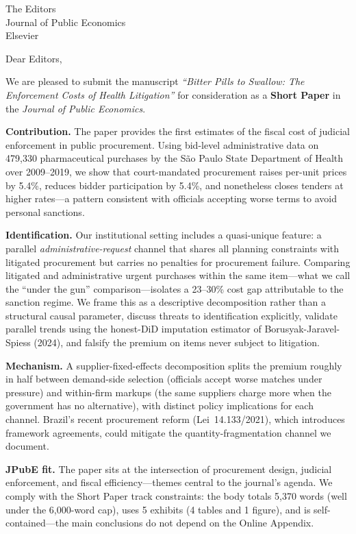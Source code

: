 \documentclass[11pt,a4paper]{letter}
\date{April 17, 2026}
\begin{document}
\begin{letter}{The Editors \\ Journal of Public Economics \\ Elsevier}

\opening{Dear Editors,}

We are pleased to submit the manuscript \emph{``Bitter Pills to Swallow: The Enforcement Costs of Health Litigation''} for consideration as a \textbf{Short Paper} in the \emph{Journal of Public Economics}.

\medskip\noindent\textbf{Contribution.} The paper provides the first estimates of the fiscal cost of judicial enforcement in public procurement. Using bid-level administrative data on 479{,}330 pharmaceutical purchases by the S\~ao Paulo State Department of Health over 2009--2019, we show that court-mandated procurement raises per-unit prices by 5.4\%, reduces bidder participation by 5.4\%, and nonetheless closes tenders at higher rates---a pattern consistent with officials accepting worse terms to avoid personal sanctions.

\medskip\noindent\textbf{Identification.} Our institutional setting includes a quasi-unique feature: a parallel \emph{administrative-request} channel that shares all planning constraints with litigated procurement but carries no penalties for procurement failure. Comparing litigated and administrative urgent purchases within the same item---what we call the ``under the gun'' comparison---isolates a 23--30\% cost gap attributable to the sanction regime. We frame this as a descriptive decomposition rather than a structural causal parameter, discuss threats to identification explicitly, validate parallel trends using the honest-DiD imputation estimator of Borusyak-Jaravel-Spiess (2024), and falsify the premium on items never subject to litigation.

\medskip\noindent\textbf{Mechanism.} A supplier-fixed-effects decomposition splits the premium roughly in half between demand-side selection (officials accept worse matches under pressure) and within-firm markups (the same suppliers charge more when the government has no alternative), with distinct policy implications for each channel. Brazil's recent procurement reform (Lei~14.133/2021), which introduces framework agreements, could mitigate the quantity-fragmentation channel we document.

\medskip\noindent\textbf{JPubE fit.} The paper sits at the intersection of procurement design, judicial enforcement, and fiscal efficiency---themes central to the journal's agenda. We comply with the Short Paper track constraints: the body totals 5{,}370 words (well under the 6{,}000-word cap), uses 5 exhibits (4 tables and 1 figure), and is self-contained---the main conclusions do not depend on the Online Appendix.


\end{letter}
\end{document}
